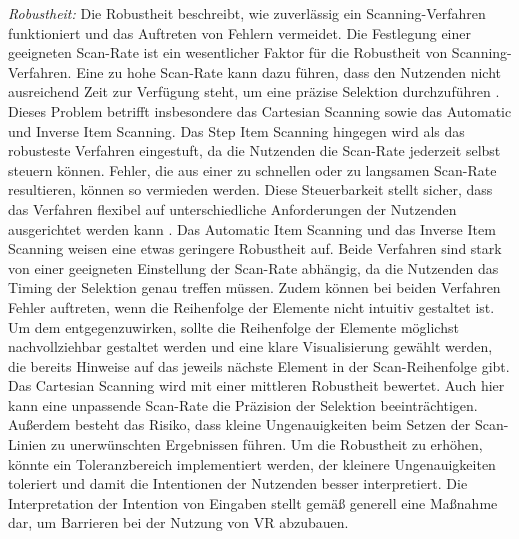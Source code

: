 \textit{Robustheit:}
Die Robustheit beschreibt, wie zuverlässig ein Scanning-Verfahren funktioniert und das Auftreten von Fehlern vermeidet. Die Festlegung einer geeigneten Scan-Rate ist ein wesentlicher Faktor für die Robustheit von Scanning-Verfahren. Eine zu hohe Scan-Rate kann dazu führen, dass den Nutzenden nicht ausreichend Zeit zur Verfügung steht, um eine präzise Selektion durchzuführen \citep{COOK2015117}. Dieses Problem betrifft insbesondere das Cartesian Scanning sowie das Automatic und Inverse Item Scanning. Das Step Item Scanning hingegen wird als das robusteste Verfahren eingestuft, da die Nutzenden die Scan-Rate jederzeit selbst steuern können. Fehler, die aus einer zu schnellen oder zu langsamen Scan-Rate resultieren, können so vermieden werden. Diese Steuerbarkeit stellt sicher, dass das Verfahren flexibel auf unterschiedliche Anforderungen der Nutzenden ausgerichtet werden kann \citep{COOK2015117}.
Das Automatic Item Scanning und das Inverse Item Scanning weisen eine etwas geringere Robustheit auf. Beide Verfahren sind stark von einer geeigneten Einstellung der Scan-Rate abhängig, da die Nutzenden das Timing der Selektion genau treffen müssen. Zudem können bei beiden Verfahren Fehler auftreten, wenn die Reihenfolge der Elemente nicht intuitiv gestaltet ist. Um dem entgegenzuwirken, sollte die Reihenfolge der Elemente möglichst nachvollziehbar gestaltet werden und eine klare Visualisierung gewählt werden, die bereits Hinweise auf das jeweils nächste Element in der Scan-Reihenfolge gibt.
Das Cartesian Scanning wird mit einer mittleren Robustheit bewertet. Auch hier kann eine unpassende Scan-Rate die Präzision der Selektion beeinträchtigen. Außerdem besteht das Risiko, dass kleine Ungenauigkeiten beim Setzen der Scan-Linien zu unerwünschten Ergebnissen führen. Um die Robustheit zu erhöhen, könnte ein Toleranzbereich implementiert werden, der kleinere Ungenauigkeiten toleriert und damit die Intentionen der Nutzenden besser interpretiert. Die Interpretation der Intention von Eingaben stellt gemäß \citet{10.1007/978-3-030-21607-8_3} generell eine Maßnahme dar, um Barrieren bei der Nutzung von VR abzubauen. 

